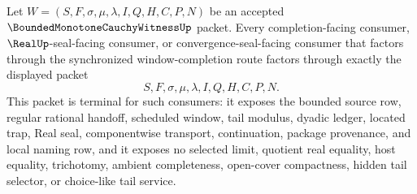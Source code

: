 \begin{theorem}
\label{thm:bounded-monotone-cauchy-witness-window-completion-terminality}
Let $W=(S,F,\sigma,\mu,\lambda,I,Q,H,C,P,N)$ be an accepted $\BoundedMonotoneCauchyWitnessUp$ packet. Every completion-facing consumer, $\RealUp$-seal-facing consumer, or convergence-seal-facing consumer that factors through the synchronized window-completion route factors through exactly the displayed packet
$$
S,F,\sigma,\mu,\lambda,I,Q,H,C,P,N.
$$
This packet is terminal for such consumers: it exposes the bounded source row, regular rational handoff, scheduled window, tail modulus, dyadic ledger, located trap, Real seal, componentwise transport, continuation, package provenance, and local naming row, and it exposes no selected limit, quotient real equality, host equality, trichotomy, ambient completeness, open-cover compactness, hidden tail selector, or choice-like tail service.
\end{theorem}
